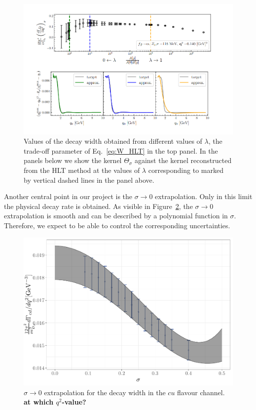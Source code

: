 \documentclass [a4paper, 11pt]{article}
\begin{document}
\begin{figure}
  \includegraphics[scale=0.5]{figures/Screenshot from 2024-07-27 18-12-04.png}
  \caption{Values of the decay width obtained from different values of $\lambda$, the trade-off
    parameter of Eq.~\ref{eq:W_HLT} in the top panel. In the panels below we show the kernel $\Theta_\sigma$ against the kernel reconstructed from the HLT method at the values of  $\lambda$ corresponding to
    marked by vertical dashed lines in the panel above.
  }
  \label{fig:stability}
\end{figure}

Another central point in our project is the $\sigma \to 0$
extrapolation. Only in this limit the physical decay rate is obtained.
As visible in Figure~\ref{fig:sigma_extrapolation}, the
$\sigma \to 0$ extrapolation is smooth and can be described by 
a polynomial function in $\sigma$. Therefore, we expect to be able to
control the corresponding uncertainties.

\begin{figure}
  \centering
  \includegraphics[scale=0.5]{figures/sigma_extrapolation.pdf}
  \caption{ $\sigma \to 0 $ extrapolation for the decay width in the
    $cu$ flavour channel. \textbf{at which $q^2$-value?}
  }
  \label{fig:sigma_extrapolation}
\end{figure}
\end{document}
